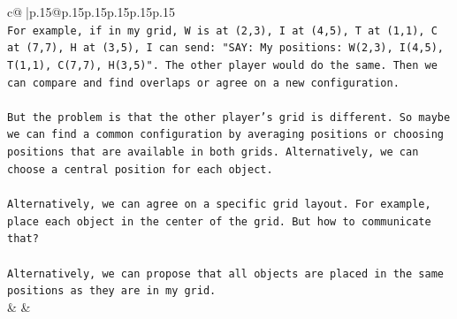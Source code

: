 \documentclass{article}
\begin{document}
{\begin{supertabular}{c@{$\;$}|p{.15\linewidth}@{}p{.15\linewidth}p{.15\linewidth}p{.15\linewidth}p{.15\linewidth}p{.15\linewidth}}
{{{\\ 
\texttt{For example, if in my grid, W is at (2,3), I at (4,5), T at (1,1), C at (7,7), H at (3,5), I can send: "SAY: My positions: W(2,3), I(4,5), T(1,1), C(7,7), H(3,5)". The other player would do the same. Then we can compare and find overlaps or agree on a new configuration. } \\
\\ 
\texttt{But the problem is that the other player's grid is different. So maybe we can find a common configuration by averaging positions or choosing positions that are available in both grids. Alternatively, we can choose a central position for each object. } \\
\\ 
\texttt{Alternatively, we can agree on a specific grid layout. For example, place each object in the center of the grid. But how to communicate that? } \\
\\ 
\texttt{Alternatively, we can propose that all objects are placed in the same positions as they are in my grid.} \\
            }
        }
    }
    & & \\ \\


\end{supertabular}}
\end{document}

